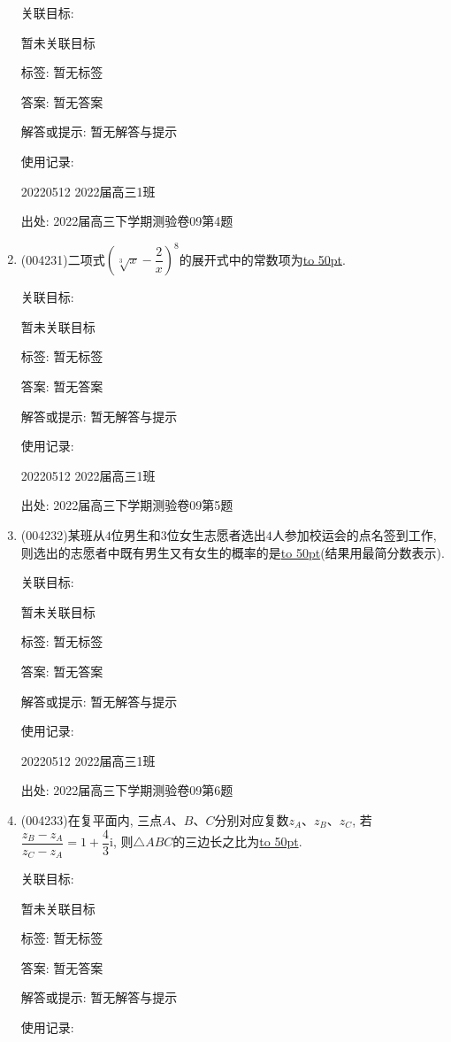 \documentclass[10pt,a4paper]{article}
\newcommand{\blank}[1]{\underline{\hbox to #1pt{}}}
\begin{document}
\begin{enumerate}[1.]
关联目标:

暂未关联目标



标签: 暂无标签

答案: 暂无答案

解答或提示: 暂无解答与提示

使用记录:

20220512	2022届高三1班	


出处: 2022届高三下学期测验卷09第4题
\item { (004231)}二项式$(\sqrt[3]x-\dfrac 2x)^8$的展开式中的常数项为\blank{50}.


关联目标:

暂未关联目标



标签: 暂无标签

答案: 暂无答案

解答或提示: 暂无解答与提示

使用记录:

20220512	2022届高三1班	


出处: 2022届高三下学期测验卷09第5题
\item { (004232)}某班从$4$位男生和$3$位女生志愿者选出$4$人参加校运会的点名签到工作, 则选出的志愿者中既有男生又有女生的概率的是\blank{50}(结果用最简分数表示).


关联目标:

暂未关联目标



标签: 暂无标签

答案: 暂无答案

解答或提示: 暂无解答与提示

使用记录:

20220512	2022届高三1班	


出处: 2022届高三下学期测验卷09第6题
\item { (004233)}在复平面内, 三点$A$、$B$、$C$分别对应复数$z_A$、$z_B$、$z_C$, 若$\dfrac{z_B-z_A}{z_C-z_A}=1+\dfrac 43\mathrm{i}$, 则$\triangle ABC$的三边长之比为\blank{50}.


关联目标:

暂未关联目标



标签: 暂无标签

答案: 暂无答案

解答或提示: 暂无解答与提示

使用记录:


\end{enumerate}
\end{document}
